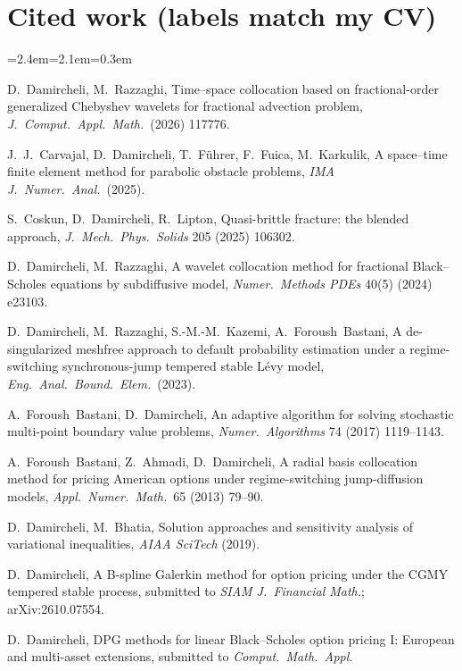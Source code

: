 \documentclass[11pt]{article}
\newcommand{\rc}[1]{\textcolor{accent}{[#1]}}
\begin{document}
\vspace{-4pt}
\section*{Cited work {\normalfont\small(labels match my CV)}}
{\footnotesize
\setlength{\parskip}{0pt}
\begin{list}{}{\leftmargin=2.4em=2.1em=0.3em\itemsep=0pt\parsep=0pt}
\item[\rc{J1}] D.~Damircheli, M.~Razzaghi, Time--space collocation based on fractional-order generalized Chebyshev wavelets for fractional advection problem, \emph{J.\ Comput.\ Appl.\ Math.}\ (2026) 117776.
\item[\rc{J2}] J.~J.~Carvajal, D.~Damircheli, T.~F\"uhrer, F.~Fuica, M.~Karkulik, A space--time finite element method for parabolic obstacle problems, \emph{IMA J.\ Numer.\ Anal.}\ (2025).
\item[\rc{J3}] S.~Coskun, D.~Damircheli, R.~Lipton, Quasi-brittle fracture: the blended approach, \emph{J.\ Mech.\ Phys.\ Solids} 205 (2025) 106302.
\item[\rc{J4}] D.~Damircheli, M.~Razzaghi, A wavelet collocation method for fractional Black--Scholes equations by subdiffusive model, \emph{Numer.\ Methods PDEs} 40(5) (2024) e23103.
\item[\rc{J5}] D.~Damircheli, M.~Razzaghi, S.-M.-M.~Kazemi, A.~Foroush~Bastani, A de-singularized meshfree approach to default probability estimation under a regime-switching synchronous-jump tempered stable L\'evy model, \emph{Eng.\ Anal.\ Bound.\ Elem.}\ (2023).
\item[\rc{J6}] A.~Foroush~Bastani, D.~Damircheli, An adaptive algorithm for solving stochastic multi-point boundary value problems, \emph{Numer.\ Algorithms} 74 (2017) 1119--1143.
\item[\rc{J7}] A.~Foroush~Bastani, Z.~Ahmadi, D.~Damircheli, A radial basis collocation method for pricing American options under regime-switching jump-diffusion models, \emph{Appl.\ Numer.\ Math.}\ 65 (2013) 79--90.
\item[\rc{C1}] D.~Damircheli, M.~Bhatia, Solution approaches and sensitivity analysis of variational inequalities, \emph{AIAA SciTech} (2019).
\item[\rc{S2}] D.~Damircheli, A B-spline Galerkin method for option pricing under the CGMY tempered stable process, submitted to \emph{SIAM J.\ Financial Math.}; arXiv:2610.07554.
\item[\rc{S3}] D.~Damircheli, DPG methods for linear Black--Scholes option pricing I: European and multi-asset extensions, submitted to \emph{Comput.\ Math.\ Appl.}

\end{list}}
\end{document}
